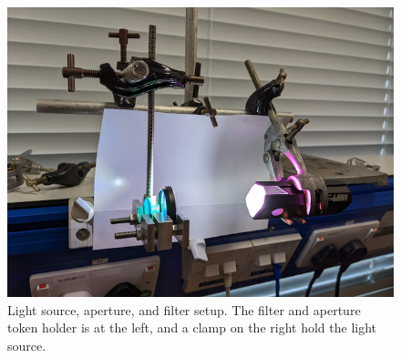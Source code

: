 \documentclass[11pt]{article}
\begin{document}
\begin{figure}[h]
    \centering
    \includegraphics[width=1\textwidth]{doc/source.png}
    \caption{Light source, aperture, and filter setup. The filter and aperture token holder is at the left, and a clamp on the right hold the light source.}
    \label{fig:source}
\end{figure}
\end{document}
